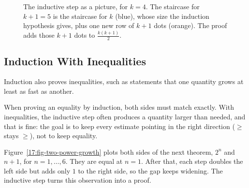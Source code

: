 \begin{figure}[htbp]
\centering
{}
\caption{The inductive step as a picture, for $k = 4$. The staircase for $k + 1 = 5$ is the staircase for $k$ (blue), whose size the induction hypothesis gives, plus one new row of $k + 1$ dots (orange). The proof adds those $k+1$ dots to $\frac{k(k+1)}{2}$.}
\label{17:fig-gauss-step}
\end{figure}

\subsection{Induction With Inequalities}

Induction also proves inequalities, such as statements that one quantity grows at least as fast as another.

When proving an equality by induction, both sides must match exactly. With inequalities, the inductive step often produces a quantity larger than needed, and that is fine: the goal is to keep every estimate pointing in the right direction ($\ge$ stays $\ge$), not to keep equality.

Figure~\ref{17:fig-two-power-growth} plots both sides of the next theorem, $2^n$ and $n + 1$, for $n = 1, \dots, 6$. They are equal at $n = 1$. After that, each step doubles the left side but adds only $1$ to the right side, so the gap keeps widening. The inductive step turns this observation into a proof.

